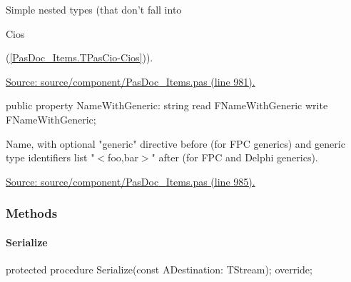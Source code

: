 \documentclass{report}
\newif\ifpdf
\begin{document}
\begin{list}{}
\par Simple nested types (that don't fall into \begin{ttfamily}Cios\end{ttfamily}(\ref{PasDoc_Items.TPasCio-Cios})).\par
\href{https://github.com/pasdoc/pasdoc/blob/master/source/component/PasDoc_Items.pas#L981}{Source: source/component/PasDoc{\_}Items.pas (line 981).}\label{PasDoc_Items.TPasCio-NameWithGeneric}
\item[\textbf{NameWithGeneric}\hfill]
\ifpdf
\begin{flushleft}
\fi
\begin{ttfamily}
public property NameWithGeneric: string read FNameWithGeneric write FNameWithGeneric;\end{ttfamily}

\ifpdf
\end{flushleft}
\fi


\par Name, with optional "generic" directive before (for FPC generics) and generic type identifiers list "{$<$}foo,bar{$>$}" after (for FPC and Delphi generics).\par
\href{https://github.com/pasdoc/pasdoc/blob/master/source/component/PasDoc_Items.pas#L985}{Source: source/component/PasDoc{\_}Items.pas (line 985).}\end{list}
\subsubsection*{\large{\textbf{Methods}}\normalsize\hspace{1ex}\hfill}
\paragraph*{Serialize}\hspace*{\fill}

\label{PasDoc_Items.TPasCio-Serialize}
\begin{list}{}{
\setlength{\itemindent}{0cm}
\setlength{\listparindent}{0cm}
\setlength{\leftmargin}{\evensidemargin}
\addtolength{\leftmargin}{\tmplength}
\settowidth{\labelsep}{X}
\addtolength{\leftmargin}{\labelsep}
\setlength{\labelwidth}{\tmplength}
}
\item[\textbf{Declaration}\hfill]
\ifpdf
\begin{flushleft}
\fi
\begin{ttfamily}
protected procedure Serialize(const ADestination: TStream); override;\end{ttfamily}

\ifpdf
\end{flushleft}
\fi

\end{list}
\end{document}

